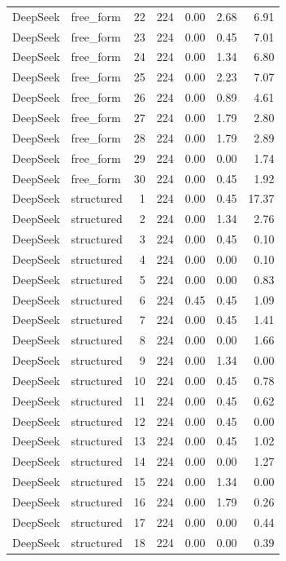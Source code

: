 \begin{longtable}{llrrrrr}
DeepSeek & free\_form & 22 & 224 & 0.00 & 2.68 & 6.91 \\
DeepSeek & free\_form & 23 & 224 & 0.00 & 0.45 & 7.01 \\
DeepSeek & free\_form & 24 & 224 & 0.00 & 1.34 & 6.80 \\
DeepSeek & free\_form & 25 & 224 & 0.00 & 2.23 & 7.07 \\
DeepSeek & free\_form & 26 & 224 & 0.00 & 0.89 & 4.61 \\
DeepSeek & free\_form & 27 & 224 & 0.00 & 1.79 & 2.80 \\
DeepSeek & free\_form & 28 & 224 & 0.00 & 1.79 & 2.89 \\
DeepSeek & free\_form & 29 & 224 & 0.00 & 0.00 & 1.74 \\
DeepSeek & free\_form & 30 & 224 & 0.00 & 0.45 & 1.92 \\
DeepSeek & structured & 1 & 224 & 0.00 & 0.45 & 17.37 \\
DeepSeek & structured & 2 & 224 & 0.00 & 1.34 & 2.76 \\
DeepSeek & structured & 3 & 224 & 0.00 & 0.45 & 0.10 \\
DeepSeek & structured & 4 & 224 & 0.00 & 0.00 & 0.10 \\
DeepSeek & structured & 5 & 224 & 0.00 & 0.00 & 0.83 \\
DeepSeek & structured & 6 & 224 & 0.45 & 0.45 & 1.09 \\
DeepSeek & structured & 7 & 224 & 0.00 & 0.45 & 1.41 \\
DeepSeek & structured & 8 & 224 & 0.00 & 0.00 & 1.66 \\
DeepSeek & structured & 9 & 224 & 0.00 & 1.34 & 0.00 \\
DeepSeek & structured & 10 & 224 & 0.00 & 0.45 & 0.78 \\
DeepSeek & structured & 11 & 224 & 0.00 & 0.45 & 0.62 \\
DeepSeek & structured & 12 & 224 & 0.00 & 0.45 & 0.00 \\
DeepSeek & structured & 13 & 224 & 0.00 & 0.45 & 1.02 \\
DeepSeek & structured & 14 & 224 & 0.00 & 0.00 & 1.27 \\
DeepSeek & structured & 15 & 224 & 0.00 & 1.34 & 0.00 \\
DeepSeek & structured & 16 & 224 & 0.00 & 1.79 & 0.26 \\
DeepSeek & structured & 17 & 224 & 0.00 & 0.00 & 0.44 \\
DeepSeek & structured & 18 & 224 & 0.00 & 0.00 & 0.39 \\

\end{longtable}
